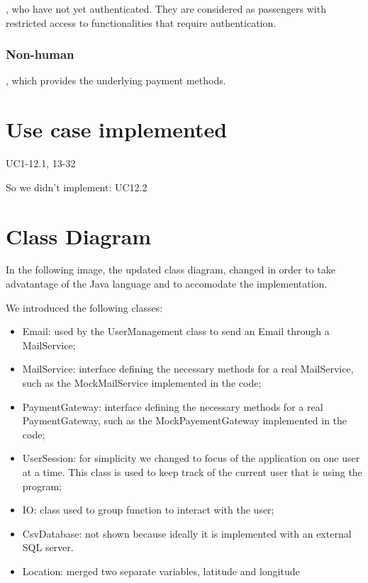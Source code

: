 \noindent{}, who have not yet authenticated. They are considered as passengers with restricted access to functionalities that require authentication.

\subsubsection*{Non-human}
, which provides the underlying payment methods.\\


\section{Use case implemented}
UC1-12.1, 13-32

So we didn't implement:
UC12.2

\section{Class Diagram}
In the following image, the updated class diagram, changed in order to take advatantage of the Java language and to accomodate the implementation.


We introduced the following classes:
\begin{itemize}
	\item Email: used by the UserManagement class to send an Email through a MailService;
	\item MailService: interface defining the necessary methods for a real MailService, such as the MockMailService implemented in the code;
	\item PaymentGateway: interface defining the necessary methods for a real PaymentGateway, such as the MockPayementGateway implemented in the code;
	\item UserSession: for simplicity we changed to focus of the application on one user at a time. This class is used to keep track of the current user that is using the program;
	\item IO: class used to group function to interact with the user;
	\item CsvDatabase: not shown because ideally it is implemented with an external SQL server.
	\item Location: merged two separate variables, latitude and longitude
\end{itemize}

